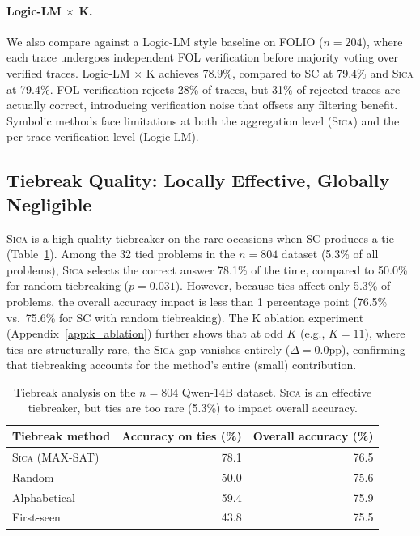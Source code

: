 \documentclass[11pt,a4paper]{article}
\newcommand{\sica}{\textsc{Sica}}
\begin{document}
\paragraph{Logic-LM $\times$ K.} We also compare against a Logic-LM style baseline on FOLIO ($n = 204$), where each trace undergoes independent FOL verification before majority voting over verified traces. Logic-LM $\times$ K achieves 78.9\%, compared to SC at 79.4\% and \sica{} at 79.4\%. FOL verification rejects 28\% of traces, but 31\% of rejected traces are actually correct, introducing verification noise that offsets any filtering benefit. Symbolic methods face limitations at both the aggregation level (\sica{}) and the per-trace verification level (Logic-LM).

\subsection{Tiebreak Quality: Locally Effective, Globally Negligible}

\sica{} is a high-quality tiebreaker on the rare occasions when SC produces a tie (Table~\ref{tab:tiebreak}). Among the 32 tied problems in the $n = 804$ dataset (5.3\% of all problems), \sica{} selects the correct answer 78.1\% of the time, compared to 50.0\% for random tiebreaking ($p = 0.031$). However, because ties affect only 5.3\% of problems, the overall accuracy impact is less than 1 percentage point (76.5\% vs.\ 75.6\% for SC with random tiebreaking). The K ablation experiment (Appendix~\ref{app:k_ablation}) further shows that at odd $K$ (e.g., $K = 11$), where ties are structurally rare, the \sica{} gap vanishes entirely ($\Delta = 0.0$pp), confirming that tiebreaking accounts for the method's entire (small) contribution.

\begin{table}[t]
\centering
\caption{Tiebreak analysis on the $n = 804$ Qwen-14B dataset. \sica{} is an effective tiebreaker, but ties are too rare (5.3\%) to impact overall accuracy.}
\label{tab:tiebreak}
\small
\begin{tabular}{lrr}
\toprule
\textbf{Tiebreak method} & \textbf{Accuracy on ties (\%)} & \textbf{Overall accuracy (\%)} \\
\midrule
\sica{} (MAX-SAT) & 78.1 & 76.5 \\
Random & 50.0 & 75.6 \\
Alphabetical & 59.4 & 75.9 \\
First-seen & 43.8 & 75.5 \\
\bottomrule
\end{tabular}
\end{table}
\end{document}
